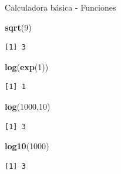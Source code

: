 \documentclass[
  ignorenonframetext,
]{beamer}
\newenvironment{Shaded}{\begin{snugshade}}{\end{snugshade}}
\newcommand{\DecValTok}[1]{\textcolor[rgb]{0.00,0.00,0.81}{#1}}
\newcommand{\KeywordTok}[1]{\textcolor[rgb]{0.13,0.29,0.53}{\textbf{#1}}}
\newcommand{\NormalTok}[1]{#1}
\begin{document}
\begin{frame}[fragile]{Calculadora básica - Funciones}
\protect\hypertarget{calculadora-buxe1sica---funciones-1}{}

\begin{Shaded}
\begin{Highlighting}[]
\KeywordTok{sqrt}\NormalTok{(}\DecValTok{9}\NormalTok{)}
\end{Highlighting}
\end{Shaded}

\begin{verbatim}
[1] 3
\end{verbatim}

\begin{Shaded}
\begin{Highlighting}[]
\KeywordTok{log}\NormalTok{(}\KeywordTok{exp}\NormalTok{(}\DecValTok{1}\NormalTok{))}
\end{Highlighting}
\end{Shaded}

\begin{verbatim}
[1] 1
\end{verbatim}

\begin{Shaded}
\begin{Highlighting}[]
\KeywordTok{log}\NormalTok{(}\DecValTok{1000}\NormalTok{,}\DecValTok{10}\NormalTok{)}
\end{Highlighting}
\end{Shaded}

\begin{verbatim}
[1] 3
\end{verbatim}

\begin{Shaded}
\begin{Highlighting}[]
\KeywordTok{log10}\NormalTok{(}\DecValTok{1000}\NormalTok{)}
\end{Highlighting}
\end{Shaded}

\begin{verbatim}
[1] 3
\end{verbatim}

\end{frame}
\end{document}
